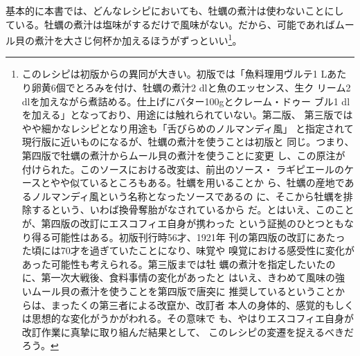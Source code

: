 \begin{recette}
基本的に本書では、どんなレシピにおいても、牡蠣の煮汁は使わないことにし
ている。牡蠣の煮汁は塩味がするだけで風味がない。だから、可能であればムー
ル貝の煮汁を大さじ何杯か加えるほうがずっといい\footnote{このレシピは初版からの異同が大きい。初版では「魚料理用ヴルテ1
  Lあたり卵黄6個でとろみを付け、牡蠣の煮汁2 dlと魚のエッセンス、生ク
  リーム2 dlを加えながら煮詰める。仕上げにバター100gとクレーム・ドゥー
  ブル1 dlを加える」となっており、用途には触れられていない。第二版、
  第三版ではやや細かなレシピとなり用途も「舌びらめのノルマンディ風」
  と指定されて現行版に近いものになるが、牡蠣の煮汁を使うことは初版と
  同じ。つまり、第四版で牡蠣の煮汁からムール貝の煮汁を使うことに変更
  し、この原注が付けられた。このソースにおける改変は、前出のソース・
  ラギピエールのケースとやや似ているところもある。牡蠣を用いることか
  ら、牡蠣の産地であるノルマンディ風という名称となったソースであるの
  に、そこから牡蠣を排除するという、いわば換骨奪胎がなされているから
  だ。とはいえ、このことが、第四版の改訂にエスコフィエ自身が携わった
  という証拠のひとつともなり得る可能性はある。初版刊行時56才、1921年
  刊の第四版の改訂にあたった頃には70才を過ぎていたことになり、味覚や
  嗅覚における感受性に変化があった可能性も考えられる。第三版までは牡
  蠣の煮汁を指定したいたのに、第一次大戦後、食料事情の変化があったと
  はいえ、きわめて風味の強いムール貝の煮汁を使うことを第四版で唐突に
  推奨しているということからは、まったくの第三者による改竄か、改訂者
  本人の身体的、感覚的もしくは思想的な変化がうかがわれる。その意味で
  も、やはりエスコフィエ自身が改訂作業に真摯に取り組んだ結果として、
  このレシピの変遷を捉えるべきだろう。}。

\maeaki

\hypertarget{ux30aaux30eaux30a8ux30f3ux30c8ux98a8ux30bdux30fcux30b9108}{%
}
\end{recette}
